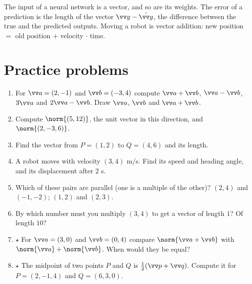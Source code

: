 \begin{aibox}
The input of a neural network is a vector, and so are its weights. The error of a prediction is the length of the vector $\vv y-\hat{\vv y}$, the difference between the true and the predicted outputs. Moving a robot is vector addition: new position $=$ old position $+$ velocity $\cdot$ time.
\end{aibox}

\section*{Practice problems}
\begin{enumerate}[label=\textbf{\thechapter.\arabic*}]
  \item For $\vv a=(2,-1)$ and $\vv b=(-3,4)$ compute $\vv a+\vv b$, $\vv a-\vv b$, $3\vv a$ and $2\vv a-\vv b$. Draw $\vv a$, $\vv b$ and $\vv a+\vv b$.
  \item Compute $\norm{(5,12)}$, the unit vector in this direction, and $\norm{(2,-3,6)}$.
  \item Find the vector from $P=(1,2)$ to $Q=(4,6)$ and its length.
  \item A robot moves with velocity $(3,4)$ m/s. Find its speed and heading angle, and its displacement after $2$ s.
  \item Which of these pairs are parallel (one is a multiple of the other)? $(2,4)$ and $(-1,-2)$; $(1,2)$ and $(2,3)$.
  \item By which number must you multiply $(3,4)$ to get a vector of length $1$? Of length $10$?
  \item $\star$ For $\vv a=(3,0)$ and $\vv b=(0,4)$ compare $\norm{\vv a+\vv b}$ with $\norm{\vv a}+\norm{\vv b}$. When would they be equal?
  \item $\star$ The midpoint of two points $P$ and $Q$ is $\frac12(\vv p+\vv q)$. Compute it for $P=(2,-1,4)$ and $Q=(6,3,0)$.
\end{enumerate}

